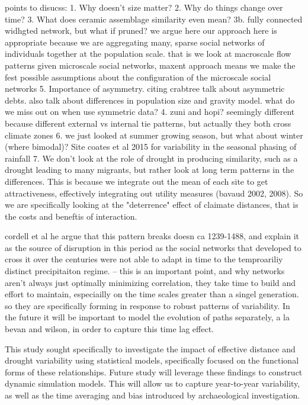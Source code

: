 \documentclass[fleqn,10pt]{wlscirep}
\begin{document}
points to disucss:
1. Why doesn't size matter?
2. Why do things change over time?
3. What does ceramic assemblage similarity even mean?
3b. fully connected widhgted network, but what if pruned?
  we argue here our approach here is appropriate because we are aggregating many, sparse social networks of individuals together at the population scale. that is we look at macroscale flow patterns given microscale social networks, maxent approach means we make the fest possible assumptions about the configuration of the microscale social networks
5. Importance of asymmetry. citing crabtree talk about asymmetric debts. also talk about differences in population size and gravity model. what do we miss out on when use symmetric data?
4. zuni and hopi? seemingly different because different external vs internal tie patterns, but actually they both cross climate zones
6. we just looked at summer growing season, but what about winter (where bimodal)? Site coates et al 2015 for variability in the seasonal phasing of rainfall
7. We don't look at the role of drought in producing similarity, such as a drought leading to many migrants, but rather look at long term patterns in the differences. This is because we integrate out the mean of each site to get attractiveness, effectively integrating out utility measures (bavaud 2002, 2008). So we are specifically looking at the "deterrence" effect of claimate distances, that is the costs and beneftis of interaction.

cordell et al he argue that this pattern breaks doesn ca 1239-1488, and explain it as the source of disruption in this period as the social networks that developed to cross it over the centuries were not able to adapt in time to the temproariliy distinct precipitaiton regime. -- this is an important point, and why networks aren't always just optimally minimizing correlation, they take time to build and effort to maintain, especiailly on the time scales greater than a singel generation. so they are specifically forming in response to robust patterns of variability. In the future it will be important to model the evolution of paths separately, a la bevan and wilson, in order to capture this time lag effect.

This study sought specifically to investigate the impact of effective distance and drought variability using statistical models, specifically focused on the functional forms of these relationships. Future study will leverage these findings to construct dynamic simulation models. This will allow us to capture year-to-year variability, as well as the time averaging and bias introduced by archaeological investigation.
\end{document}

